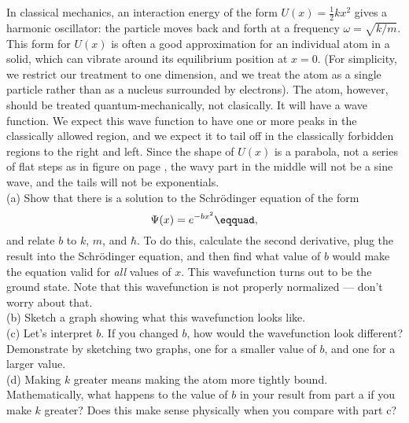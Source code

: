 In classical mechanics, an interaction energy of the form
$U(x)=\frac{1}{2}kx^2$ gives a harmonic oscillator: the particle moves
back and forth at a frequency $\omega=\sqrt{k/m}$. This form
for $U(x)$ is often a good approximation for an individual atom
in a solid, which can vibrate around its equilibrium position
at $x=0$. (For simplicity, we restrict our treatment to one
dimension, and we treat the atom as a single particle rather
than as a nucleus surrounded by electrons).
The atom, however, should be treated quantum-mechanically,
not clasically. It will have a wave function. We expect this wave
function to have one or more peaks in the classically allowed
region, and we expect it to tail off in the classically
forbidden regions to the right and left. Since the shape
of $U(x)$ is a parabola, not a series of flat steps as
in figure  on page \pageref{fig:barrier-with-u-notation}, the
wavy part in the middle will not be a sine wave, and the
tails will not be exponentials.\\
(a) Show that there is a solution
to the Schr\"{o}dinger equation of the form
\begin{equation*}
\Psi(x)=e^{-bx^2}\eqquad,
\end{equation*}
and relate $b$ to $k$, $m$, and $\hbar$. To do this, calculate the
second derivative, plug the result into the Schr\"{o}dinger
equation, and then find what value of $b$ would make the equation
valid for \emph{all} values of $x$. 
This wavefunction turns out to be the ground state.
Note that this wavefunction
is not properly normalized --- don't worry about that.\answercheck\\
(b) Sketch a graph showing what this wavefunction looks like.\\
(c) Let's interpret $b$. If you changed $b$, how would the wavefunction
look different? Demonstrate by sketching two graphs, one for a smaller
value of $b$, and one for a larger value.\\
(d) Making $k$ greater means making the atom more tightly bound.
Mathematically, what happens to the value of $b$ in
your result from part a if you make $k$ greater? Does this make
sense physically when you compare with part c?

